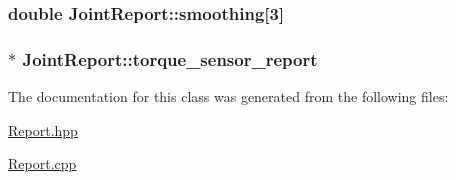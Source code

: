 \subsubsection[{\texorpdfstring{smoothing}{smoothing}}]{\setlength{\rightskip}{0pt plus 5cm}double Joint\+Report\+::smoothing\mbox{[}3\mbox{]}}\hypertarget{classJointReport_a6419b87cfff8248af1432d39e7fc6469}{}\label{classJointReport_a6419b87cfff8248af1432d39e7fc6469}
\subsubsection[{\texorpdfstring{torque\+\_\+sensor\+\_\+report}{torque_sensor_report}}]{$\ast$ Joint\+Report\+::torque\+\_\+sensor\+\_\+report}\hypertarget{classJointReport_a6aa2fd9a4b9d74c5d5205ecf774693d8}{}\label{classJointReport_a6aa2fd9a4b9d74c5d5205ecf774693d8}


The documentation for this class was generated from the following files\+:\begin{DoxyCompactItemize}
\item 
\hyperlink{Report_8hpp}{Report.\+hpp}\item 
\hyperlink{Report_8cpp}{Report.\+cpp}\end{DoxyCompactItemize}
